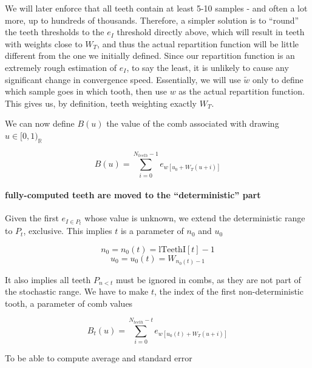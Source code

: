 \documentclass[./thesis.tex]{subfiles}
\newcommand{\lTeethI}{\text{lTeethI}}
\begin{document}
We will later enforce that all teeth contain at least 5-10 samples - and often a lot more, up to hundreds of thousands. Therefore, a simpler solution is to ``round'' the teeth thresholds to the $e_I$ threshold directly above, which will result in teeth with weights close to $W_T$, and thus the actual repartition function will be little different from the one we initially defined. Since our repartition function is an extremely rough estimation of $e_I$, to say the least, it is unlikely to cause any significant change in convergence speed.
Essentially, we will use $\tilde w$ only to define which sample goes in which tooth, then use $w$ as the actual repartition function. This gives us, by definition, teeth weighting exactly $W_T$.

We can now define $B(u)$ the value of the comb associated with drawing $u \in [0,1)_\mathbb{R}$

\begin{equation}
B(u) = \sum_{i=0}^{N_{teeth}-1} e_{w[u_0+ W_T(u+i)]}
\end{equation}

\paragraph{fully-computed teeth are moved to the ``deterministic'' part}
Given the first $e_{I \in P_t}$ whose value is unknown, we extend the deterministic range to $P_t$, exclusive. This implies $t$ is a parameter of $n_0$ and $u_0$

\begin{equation}
n_0 = n_0(t) = \lTeethI[t]-1
\end{equation}
\begin{equation}
u_0 = u_0(t) = W_{n_0(t) -1}
\end{equation}

It also implies all teeth $P_{n<t}$ must be ignored in combs, as they are not part of the stochastic range. We have to make $t$, the index of the first non-deterministic tooth, a parameter of comb values

\begin{equation}
B_t(u) = \sum_{i=0}^{N_{teeth}-t} e_{w[u_0(t)+ W_T(u+i)]}
\end{equation}

To be able to compute average and standard error 
\end{document}
